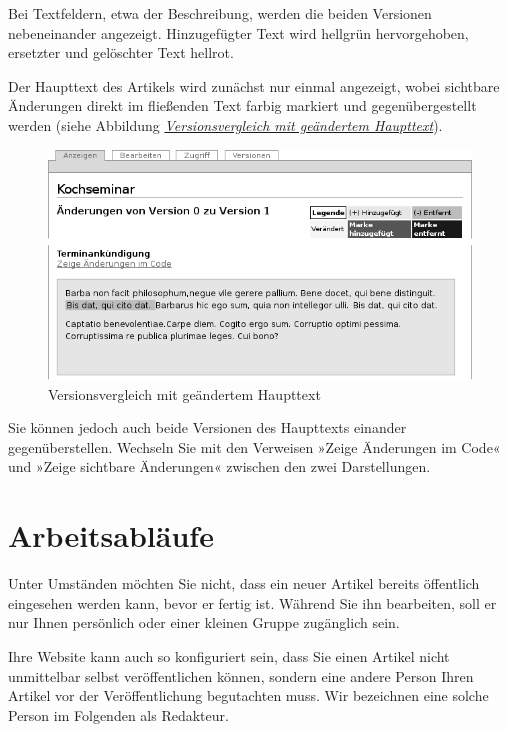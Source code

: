 \documentclass[a4paper,12pt,ngerman]{manual}
\begin{document}
Bei Textfeldern, etwa der Beschreibung, werden die beiden Versionen
nebeneinander angezeigt. Hinzugefügter Text wird hellgrün hervorgehoben,
ersetzter und gelöschter Text hellrot.

Der Haupttext des Artikels wird zunächst nur einmal angezeigt, wobei
sichtbare Änderungen direkt im fließenden Text farbig markiert und
gegenübergestellt werden (siehe
Abbildung \hyperlink{fig-versionsvergleich-haupttext}{\emph{Versionsvergleich mit geändertem Haupttext}}).
\hypertarget{fig-versionsvergleich-haupttext}{}\begin{figure}[htbp]
\centering

\includegraphics{versionsvergleich-haupttext.png}
\caption{Versionsvergleich mit geändertem Haupttext}\end{figure}

Sie können jedoch auch beide Versionen des Haupttexts einander
gegenüberstellen. Wechseln Sie mit den Verweisen »Zeige Änderungen im Code«
und »Zeige sichtbare Änderungen« zwischen den zwei Darstellungen.

\resetcurrentobjects
\hypertarget{--doc-umgang/workflow}{}

\hypertarget{sec-workflow}{}\section{Arbeitsabläufe}

Unter Umständen möchten Sie nicht, dass ein neuer Artikel bereits öffentlich
eingesehen werden kann, bevor er fertig ist. Während Sie ihn bearbeiten, soll
er nur Ihnen persönlich oder einer kleinen Gruppe zugänglich sein.

Ihre Website kann auch so konfiguriert sein, dass Sie einen Artikel nicht
unmittelbar selbst veröffentlichen können, sondern eine andere Person Ihren
Artikel vor der Veröffentlichung begutachten muss. Wir bezeichnen eine solche
Person im Folgenden als Redakteur.
\end{document}
